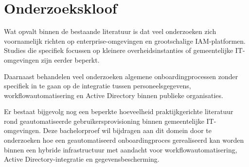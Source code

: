 \section{Onderzoekskloof}

Wat opvalt binnen de bestaande literatuur is dat veel onderzoeken zich voornamelijk richten op enterprise-omgevingen en grootschalige IAM-platformen. Studies die specifiek focussen op kleinere overheidsinstanties of gemeentelijke IT-om\-ge\-vin\-gen zijn eerder beperkt.

Daarnaast behandelen veel onderzoeken algemene onboardingprocessen zonder specifiek in te gaan op de integratie tussen personeelsgegevens, workflowautomatisering en Active Directory binnen publieke organisaties.

Er bestaat bijgevolg nog een beperkte hoeveelheid praktijkgerichte literatuur rond geautomatiseerde gebruikersprovisioning binnen gemeentelijke IT-omgevingen. Deze bachelorproef wil bijdragen aan dit domein door te onderzoeken hoe een geautomatiseerd onboardingproces gerealiseerd kan worden binnen een hybride infrastructuur met aandacht voor workflowautomatisering, Active Directory-in\-te\-gra\-tie en gegevensbescherming.